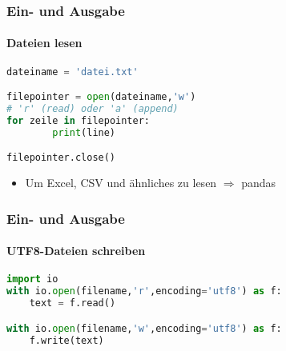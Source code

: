 \documentclass[12pt,ngerman]{beamer}
\begin{document}
\begin{frame}[fragile]
\frametitle{Ein- und Ausgabe}
\framesubtitle{Dateien lesen}

\begin{lstlisting}[language={Python},caption={Ein- und Ausgabe: Dateien}]
dateiname = 'datei.txt'

filepointer = open(dateiname,'w') 
# 'r' (read) oder 'a' (append)
for zeile in filepointer:
        print(line)

filepointer.close()
\end{lstlisting}

\begin{itemize}
	\item Um Excel, CSV und ähnliches zu lesen $\Rightarrow$ pandas
\end{itemize}
\end{frame}


\begin{frame}[fragile]
\frametitle{Ein- und Ausgabe}
\framesubtitle{UTF8-Dateien schreiben}

\begin{lstlisting}[language={Python},caption={Ein- und Ausgabe: UTF8 Dateien}]
import io
with io.open(filename,'r',encoding='utf8') as f:
    text = f.read()

with io.open(filename,'w',encoding='utf8') as f:
    f.write(text)
\end{lstlisting}
\end{frame}
\end{document}
